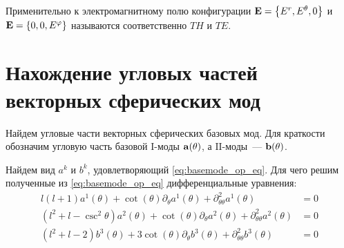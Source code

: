 \documentclass[12pt,a4paper]{article}
\begin{document}
        Применительно к электромагнитному полю конфигурации $\vb{E} = \qty{ E^r, E^\theta, 0 }$ и $\vb{E} = \qty{ 0, 0, E^\varphi }$ называются соответственно\footnotemark{} $TH$ и $TE$.



    \section{Нахождение угловых частей векторных сферических мод}

        Найдем угловые части векторных сферических базовых мод. Для краткости обозначим угловую часть базовой $\mathrm{I}$-моды $\vb{a}(\theta)$, а $\mathrm{II}$-моды~--- $\vb{b}(\theta)$.

        Найдем вид $a^k$ и $b^k$, удовлетворяющий \autoref{eq:basemode_op_eq}. Для чего решим полученные из \autoref{eq:basemode_op_eq} дифференциальные уравнения:
        \begin{equation}\begin{aligned}
            l (l + 1) a^1(\theta)
                + \cot(\theta) \partial_\theta a^1(\theta)
                + \partial^2_{\theta\theta} a^1(\theta) &= 0 \\
            (l^2 + l - \csc^2\theta) a^2(\theta)
                + \cot(\theta) \partial_\theta a^2(\theta)
                + \partial^2_{\theta\theta} a^2(\theta) &= 0 \\
            (l^2 + l - 2) b^3(\theta)
                + 3 \cot(\theta) \partial_\theta b^3(\theta)
                + \partial^2_{\theta\theta} b^3(\theta) &= 0
        \end{aligned}\end{equation}
\end{document}
